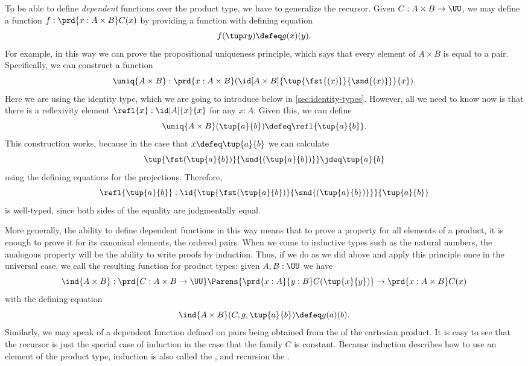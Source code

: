 To be able to define \emph{dependent} functions over the product type, we have
to generalize the recursor. Given $C: A \times B \to \UU$, we may
define a function $f : \prd{x : A \times B} C(x)$ by providing a
function
with defining equation
\[ f(\tup x y) \defeq g(x)(y). \] 
For example, in this way we can prove the propositional uniqueness principle, which says that every element of $A\times B$ is equal to a pair.
%
Specifically, we can construct a function
\[ \uniq{A\times B} : \prd{x:A \times B} (\id[A\times B]{\tup{\fst {(x)}}{\snd {(x)}}}{x}). \]
Here we are using the identity type, which we are going to introduce below in \cref{sec:identity-types}.
However, all we need to know now is that there is a reflexivity element $\refl{x} : \id[A]{x}{x}$ for any $x:A$.
Given this, we can define
\label{uniquenessproduct}
\[ \uniq{A\times B}(\tup{a}{b}) \defeq \refl{\tup{a}{b}}. \]
This construction works, because in the case that $x \defeq \tup{a}{b}$ we can 
calculate 
\[ \tup{\fst(\tup{a}{b})}{\snd{(\tup{a}{b})}} \jdeq \tup{a}{b} \]
using the defining equations for the projections. Therefore,
\[ \refl{\tup{a}{b}} : \id{\tup{\fst(\tup{a}{b})}{\snd{(\tup{a}{b})}}}{\tup{a}{b}} \]
is well-typed, since both sides of the equality are judgmentally equal.

More generally, the ability to define dependent functions in this way means that to prove a property for all elements of a product, it is enough 
to prove it for its canonical elements, the ordered pairs.
When we come to inductive types such as the natural numbers, the analogous property will be the ability to write proofs by induction.
Thus, if we do as we did above and apply this principle once in the universal case, we call the resulting function  for product types: given $A,B : \UU$ we have
%
\[ \ind{A\times B} : \prd{C:A \times B \to \UU}
\Parens{\prd{x:A}{y:B} C(\tup{x}{y})} \to \prd{x:A \times B} C(x) \]
with the defining equation 
\[ \ind{A\times B}(C,g,\tup{a}{b}) \defeq g(a)(b). \]
Similarly, we may speak of a dependent function defined on pairs being obtained from the 
%
%
of the cartesian product.
It is easy to see that the recursor is just the special case of induction
in the case that the family $C$ is constant.
Because induction describes how to use an element of the product type, induction is also called the ,
%
and recursion the .
%
%
%

